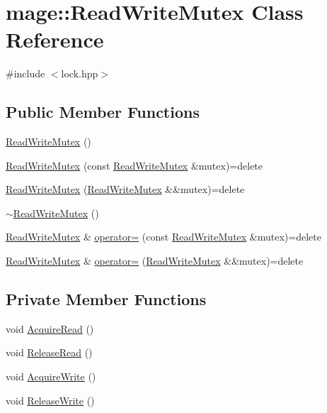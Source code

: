 \hypertarget{classmage_1_1_read_write_mutex}{}\section{mage\+:\+:Read\+Write\+Mutex Class Reference}
\label{classmage_1_1_read_write_mutex}


{\ttfamily \#include $<$lock.\+hpp$>$}

\subsection*{Public Member Functions}
\begin{DoxyCompactItemize}
\item 
\hyperlink{classmage_1_1_read_write_mutex_aae10694de3862f2d1059477169883940}{Read\+Write\+Mutex} ()
\item 
\hyperlink{classmage_1_1_read_write_mutex_aacb2f69e7e2b084147e1e45628e9dd67}{Read\+Write\+Mutex} (const \hyperlink{classmage_1_1_read_write_mutex}{Read\+Write\+Mutex} \&mutex)=delete
\item 
\hyperlink{classmage_1_1_read_write_mutex_a664e946edfa742dad648fc9fcb29832e}{Read\+Write\+Mutex} (\hyperlink{classmage_1_1_read_write_mutex}{Read\+Write\+Mutex} \&\&mutex)=delete
\item 
\hyperlink{classmage_1_1_read_write_mutex_a73676d9414658d63edfe443ee1d55c8b}{$\sim$\+Read\+Write\+Mutex} ()
\item 
\hyperlink{classmage_1_1_read_write_mutex}{Read\+Write\+Mutex} \& \hyperlink{classmage_1_1_read_write_mutex_a408e06f3c8bcc644e43afbf7e9ac772f}{operator=} (const \hyperlink{classmage_1_1_read_write_mutex}{Read\+Write\+Mutex} \&mutex)=delete
\item 
\hyperlink{classmage_1_1_read_write_mutex}{Read\+Write\+Mutex} \& \hyperlink{classmage_1_1_read_write_mutex_a14ea4d1be75046741a7663e0d86a017a}{operator=} (\hyperlink{classmage_1_1_read_write_mutex}{Read\+Write\+Mutex} \&\&mutex)=delete
\end{DoxyCompactItemize}
\subsection*{Private Member Functions}
\begin{DoxyCompactItemize}
\item 
void \hyperlink{classmage_1_1_read_write_mutex_af78045647078aaf3966c8f1b06e35c92}{Acquire\+Read} ()
\item 
void \hyperlink{classmage_1_1_read_write_mutex_a0af5059a9bd16abd8a21b15e7ebe053d}{Release\+Read} ()
\item 
void \hyperlink{classmage_1_1_read_write_mutex_a76137013107a9c2c1fc05c1e0747965e}{Acquire\+Write} ()
\item 
void \hyperlink{classmage_1_1_read_write_mutex_ad0fd296bdaa212f54a58372c8dfe1d1d}{Release\+Write} ()
\end{DoxyCompactItemize}
